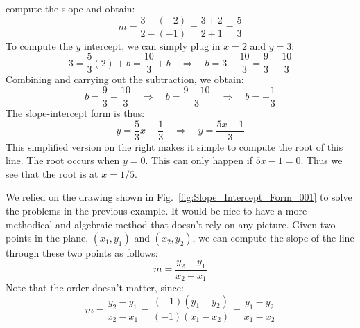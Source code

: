 \documentclass[crop=false,class=book,oneside]{standalone}                      %
\begin{document}
\begin{lexample}
                compute the slope and obtain:
                \begin{equation}
                    m=\frac{3-(\minus{2})}{2-(\minus{1})}
                     =\frac{3+2}{2+1}
                     =\frac{5}{3}
                \end{equation}
                To compute the $y$ intercept, we can simply plug in $x=2$
                and $y=3$:
                \begin{equation}
                    3=\frac{5}{3}(2)+b
                     =\frac{10}{3}+b
                    \quad\Longrightarrow\quad
                    b=3-\frac{10}{3}
                     =\frac{9}{3}-\frac{10}{3}
                \end{equation}
                Combining and carrying out the subtraction, we obtain:
                \begin{equation}
                    b=\frac{9}{3}-\frac{10}{3}
                    \quad\Longrightarrow\quad
                    b=\frac{9-10}{3}
                    \quad\Longrightarrow\quad
                    b=\minus\frac{1}{3}
                \end{equation}
                The slope-intercept form is thus:
                \begin{equation}
                    y=\frac{5}{3}x-\frac{1}{3}
                    \quad\Longrightarrow\quad
                    y=\frac{5x-1}{3}
                \end{equation}
                This simplified version on the right makes it simple to
                compute the root of this line. The root occurs when $y=0$.
                This can only happen if $5x-1=0$. Thus we see that the root
                is at $x=1/5$.
            \end{lexample}
            We relied on the drawing shown in
            Fig.~\ref{fig:Slope_Intercept_Form_001} to solve the problems in
            the previous example. It would be nice to have a more methodical
            and algebraic method that doesn't rely on any picture.
            Given two points in the plane, $(x_{1},y_{1})$ and $(x_{2},y_{2})$,
            we can compute the slope of the line through these two points
            as follows:
            \begin{equation}
                m=\frac{y_{2}-y_{1}}{x_{2}-x_{1}}
            \end{equation}
            Note that the order doesn't matter, since:
            \begin{equation}
                m=\frac{y_{2}-y_{1}}{x_{2}-x_{1}}
                 =\frac{(\minus{1})(y_{1}-y_{2})}{(\minus{1})(x_{1}-x_{2})}
                 =\frac{y_{1}-y_{2}}{x_{1}-x_{2}}
            \end{equation}
\end{document}
